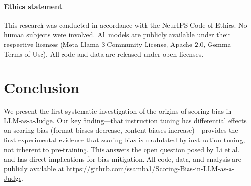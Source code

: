 \documentclass[11pt,twocolumn]{article}
\begin{document}
\paragraph{Ethics statement.}
This research was conducted in accordance with the NeurIPS Code of Ethics. No human subjects were involved. All models are publicly available under their respective licenses (Meta Llama 3 Community License, Apache 2.0, Gemma Terms of Use). All code and data are released under open licenses.

\section{Conclusion}

We present the first systematic investigation of the origins of scoring bias in LLM-as-a-Judge. Our key finding---that instruction tuning has differential effects on scoring bias (format biases decrease, content biases increase)---provides the first experimental evidence that scoring bias is modulated by instruction tuning, not inherent to pre-training. This answers the open question posed by Li et al.~\cite{li2025scoring} and has direct implications for bias mitigation. All code, data, and analysis are publicly available at \url{https://github.com/ssamba1/Scoring-Bias-in-LLM-as-a-Judge}.
\end{document}
